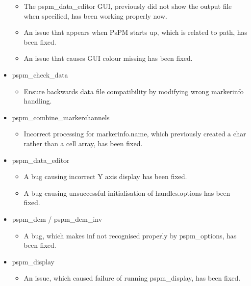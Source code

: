 \documentclass[english]{article}
\numberwithin{equation}{section}
\numberwithin{figure}{section}
\begin{document}
\begin{itemize}
\begin{itemize}
\item The pspm\_data\_editor GUI, previously did not show the output file when specified, has been working properly now.

\item An issue that appears when PsPM starts up, which is related to path, has been fixed.

\item An issue that causes GUI colour missing has been fixed.
\end{itemize}

\item pspm\_check\_data

\begin{itemize}
\item Ensure backwards data file compatibility by modifying wrong markerinfo handling.
\end{itemize}

\item pspm\_combine\_markerchannels

\begin{itemize}
\item Incorrect processing for markerinfo.name, which previously created a char rather than a cell array, has been fixed.
\end{itemize}

\item pspm\_data\_editor

\begin{itemize}
\item A bug causing incorrect Y axis display has been fixed.

\item A bug causing unsuccessful initialisation of handles.options has been fixed.
\end{itemize}

\item pspm\_dcm / pspm\_dcm\_inv

\begin{itemize}
\item A bug, which makes inf not recognised properly by pspm\_options, has been fixed.
\end{itemize}

\item pspm\_display

\begin{itemize}
\item An issue, which caused failure of running pspm\_display, has been fixed.
\end{itemize}


\end{itemize}
\end{document}
